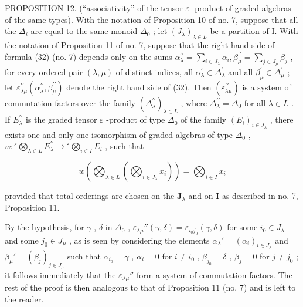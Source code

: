 PROPOSITION 12. (``associativity'' of the tensor \(\varepsilon\) -product of graded algebras of the same types). With the notation of Proposition 10 of no. 7, suppose that all the \(\Delta_{i}\) are equal to the same monoid \(\Delta_{0}\) ; let \((J_{\lambda})_{\lambda \in L}\) be a partition of I. With the notation of Proposition 11 of no. 7, suppose that the right hand side of formula (32) (no. 7) depends only on the sums \(\alpha_{\lambda}^{\prime \prime} = \sum_{i \in J_{\lambda}} \alpha_{i}, \beta_{\mu}^{\prime \prime} = \sum_{j \in J_{\mu}} \beta_{j}\) , for every ordered pair \((\lambda, \mu)\) of distinct indices, all \(\alpha_{\lambda}^{\prime} \in \Delta_{\lambda}^{\prime}\) and all \(\beta_{\mu}^{\prime} \in \Delta_{\mu}^{\prime}\) ; let \(\varepsilon_{\lambda \mu}^{\prime \prime}(\alpha_{\lambda}^{\prime \prime}, \beta_{\mu}^{\prime \prime})\) denote the right hand side of (32). Then \((\varepsilon_{\lambda \mu}^{\prime \prime})\) is a system of commutation factors over the family \((\Delta_{\lambda}^{\prime \prime})_{\lambda \in L}\) , where \(\Delta_{\lambda}^{\prime \prime} = \Delta_{0}\) for all \(\lambda \in L\) . If \(E_{\lambda}^{\prime \prime}\) is the graded tensor \(\varepsilon\) -product of type \(\Delta_{0}\) of the family \((E_{i})_{i \in J_{\lambda}}\) , there exists one and only one isomorphism of graded algebras of type \(\Delta_{0}\) , \(w: {}^{\varepsilon}\bigotimes_{\lambda \in L} E_{\lambda}^{\prime \prime} \to {}^{\varepsilon}\bigotimes_{i \in I} E_{i}\) , such that

\[
w \left(\bigotimes_ {\lambda \in L} \left(\bigotimes_ {i \in J _ {\lambda}} x _ {i}\right)\right) = \bigotimes_ {i \in I} x _ {i}\tag{35}
\]

provided that total orderings are chosen on the \(\mathbf{J}_{\lambda}\) and on \(\mathbf{I}\) as described in no. 7, Proposition 11.

By the hypothesis, for \(\gamma\) , \(\delta\) in \(\Delta_0\) , \(\varepsilon_{\lambda \mu}''(\gamma, \delta) = \varepsilon_{i_0 j_0}(\gamma, \delta)\) for some \(i_0 \in J_\lambda\) and some \(j_0 \in J_\mu\) , as is seen by considering the elements \(\alpha_\lambda' = (\alpha_i)_{i \in J_\lambda}\) and \(\beta_\mu' = (\beta_j)_{j \in J_\mu}\) such that \(\alpha_{i_0} = \gamma\) , \(\alpha_i = 0\) for \(i \neq i_0\) , \(\beta_{j_0} = \delta\) , \(\beta_j = 0\) for \(j \neq j_0\) ; it follows immediately that the \(\varepsilon_{\lambda \mu}''\) form a system of commutation factors. The rest of the proof is then analogous to that of Proposition 11 (no. 7) and is left to the reader.


